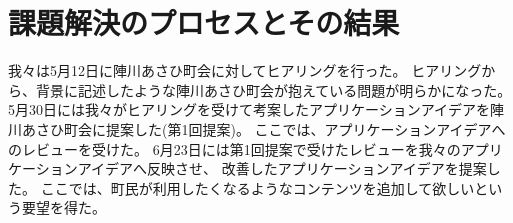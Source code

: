 \section{課題解決のプロセスとその結果}
我々は5月12日に陣川あさひ町会に対してヒアリングを行った。
ヒアリングから、背景に記述したような陣川あさひ町会が抱えている問題が明らかになった。
5月30日には我々がヒアリングを受けて考案したアプリケーションアイデアを陣川あさひ町会に提案した(第1回提案)。
ここでは、アプリケーションアイデアへのレビューを受けた。
6月23日には第1回提案で受けたレビューを我々のアプリケーションアイデアへ反映させ、
改善したアプリケーションアイデアを提案した。
ここでは、町民が利用したくなるようなコンテンツを追加して欲しいという要望を得た。
